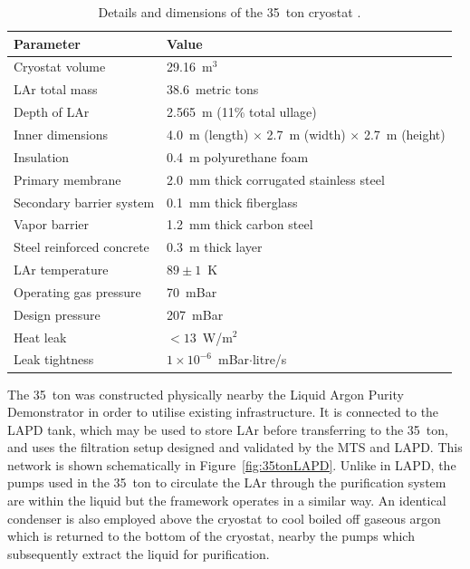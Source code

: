 \begin{table}
  \caption[Details and dimensions of the 35~ton cryostat.]{Details and dimensions of the 35~ton cryostat \cite{35tonPhaseI2015}.}
  \label{tab:35tonCryostat}
  \centering
  \begin{tabular}{ l l }
    \toprule
    Parameter & Value \\
    \midrule
    Cryostat volume           & 29.16~m$^3$ \\
    LAr total mass            & 38.6~metric tons \\
    Depth of LAr              & 2.565~m (11\% total ullage) \\
    Inner dimensions          & 4.0~m (length) $\times$ 2.7~m (width) $\times$ 2.7~m (height) \\
    Insulation                & 0.4~m polyurethane foam \\
    Primary membrane          & 2.0~mm thick corrugated stainless steel \\
    Secondary barrier system  & 0.1~mm thick fiberglass \\
    Vapor barrier             & 1.2~mm thick carbon steel \\
    Steel reinforced concrete & 0.3~m thick layer \\
    LAr temperature           & $89\pm1$~K \\
    Operating gas pressure    & 70~mBar \\
    Design pressure           & 207~mBar \\
    Heat leak                 & $<13$~W/m$^2$ \\
    Leak tightness            & $1\times10^{-6}$~mBar$\cdot$litre/s \\
    \bottomrule
  \end{tabular}
\end{table}

The 35~ton was constructed physically nearby the Liquid Argon Purity Demonstrator in order to utilise existing infrastructure.  It is connected to the LAPD tank, which may be used to store LAr before transferring to the 35~ton, and uses the filtration setup designed and validated by the MTS and LAPD.  This network is shown schematically in Figure~\ref{fig:35tonLAPD}.  Unlike in LAPD, the pumps used in the 35~ton to circulate the LAr through the purification system are within the liquid but the framework operates in a similar way.  An identical condenser is also employed above the cryostat to cool boiled off gaseous argon which is returned to the bottom of the cryostat, nearby the pumps which subsequently extract the liquid for purification.

